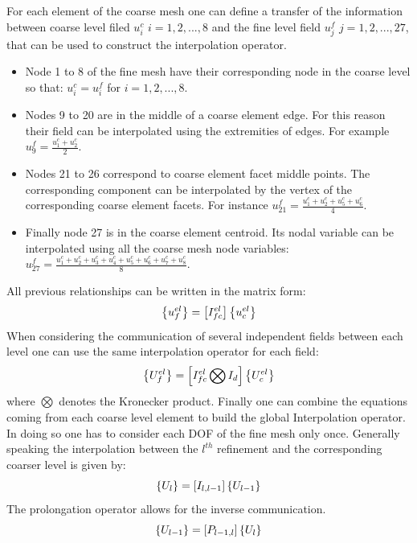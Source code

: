      For each element of the coarse mesh one can define a transfer of the information between coarse level filed $u^c_i$ $i=1,2,...,8$ and the fine level field $u^f_j$ $j=1,2,...,27$, that can be used to construct the interpolation operator. 
     \begin{itemize}
     \item Node 1 to 8 of the fine mesh have their corresponding node in the coarse level so that: $u^c_i=u^f_i$ for $i=1,2,...,8$.
     \item Nodes 9 to 20 are in the middle of a coarse element edge. For this reason their field can be interpolated using the extremities of edges. For example $u^f_9=\frac{u^c_1+u^c_2}{2}$.
     \item Nodes 21 to 26 correspond to coarse element facet middle points. The corresponding component can be interpolated by the vertex of the corresponding coarse element facets. For instance $u^f_{21}=\frac{u^c_1+u^c_2+u^c_5+u^c_6}{4}$.
     \item Finally node 27 is in the coarse element centroid. Its nodal variable can be interpolated using all the coarse mesh node variables: $u^f_{27}=\frac{u^c_1+u^c_2+u^c_3+u^c_4+u^c_5+u^c_6+u^c_7+u^c_8}{8}$.
     \end{itemize}
        All previous relationships can be written in the matrix form: 
     \begin{equation}
     \left\lbrace{u_f^{el}}\right \rbrace=\left[{I_{fc}^{el}}\right]\left\lbrace{u_c^{el}}\right \rbrace
     \end{equation}
     When considering the communication of several independent fields between each level one can use the same interpolation operator for each field:
     \begin{equation}
     \left\lbrace{U_f^{el}}\right \rbrace=\left[{I_{fc}^{el}\bigotimes I_d}\right]\left\lbrace{U_c^{el}}\right \rbrace
     \end{equation}
     where $\bigotimes$ denotes the Kronecker product.
     Finally one can combine the equations coming from each coarse level element to build the global Interpolation operator. In doing so one has to consider each DOF of the fine mesh only once. Generally speaking the interpolation between the $l^{th}$ refinement and the corresponding coarser level is given by: 
      \begin{equation}
      \left\lbrace{U_l}\right \rbrace=\left[{I_{l,l-1}}\right]\left\lbrace{U_{l-1}}\right \rbrace
      \end{equation}
      The prolongation operator allows for the inverse communication.  
 \begin{equation}
       \left\lbrace{U_{l-1}}\right \rbrace=\left[{P_{l-1,l}}\right]\left\lbrace{U_{l}}\right \rbrace
 \end{equation}
